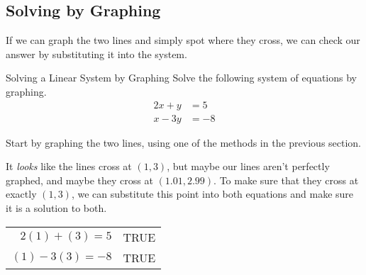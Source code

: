 \subsection{Solving by Graphing}
If we can graph the two lines and simply spot where they cross, we can check our answer by substituting it into the system.

\begin{example}[https://www.youtube.com/watch?v=ymuYIaGzWw8]{Solving a Linear System by Graphing}
Solve the following system of equations by graphing.
\begin{align*}
2x+y &= 5\\
x-3y &= -8
\end{align*}

\sol
Start by graphing the two lines, using one of the methods in the previous section.
\begin{center}
\end{center}

It \emph{looks} like the lines cross at $(1,3)$, but maybe our lines aren't perfectly graphed, and maybe they cross at $(1.01,2.99)$.  To make sure that they cross at exactly $(1,3)$, we can substitute this point into both equations and make sure it is a solution to both.

\begin{center}
\begin{tabular}{r l}
$2(1)+(3)=5$ & TRUE\\
$(1)-3(3)=-8$ & TRUE
\end{tabular}
\end{center}
\end{example}

